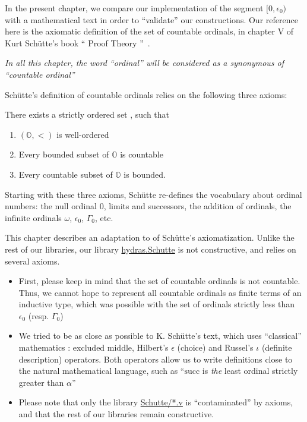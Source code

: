 \label{chap:schutte} 

In the present chapter, we  compare our implementation of the segment $[0,\epsilon_0)$ with a mathematical text in order to ``validate'' our constructions.
Our reference here is the axiomatic definition of the set of countable ordinals,
in chapter V of Kurt Schütte's book `` Proof Theory ''~\cite{schutte}.

\begin{remark}
\emph{In all this chapter, the word ``ordinal'' will be considered as a synonymous of
``countable ordinal''}  
\end{remark}



Schütte's definition of countable ordinals relies on the following three axioms:

There  exists a strictly ordered set , such that
\begin{enumerate}
\item  $(\mathbb{O},<)$ is well-ordered
\item Every bounded subset of $\mathbb{O}$  is countable
\item Every countable subset of $\mathbb{O}$  is bounded.
\end{enumerate}

Starting with these three axioms, Schütte re-defines the vocabulary about ordinal numbers: the null ordinal $0$, limits and successors, the addition of ordinals, the infinite ordinals $\omega$, $\epsilon_0$, $\Gamma_0$, etc.

This chapter describes an adaptation to \coq{} of Schütte's axiomatization. 
 Unlike the rest of our libraries, our library
\href{../theories/html/hydras.Schutte.Schutte.html}{hydras.Schutte}
is not constructive, and relies on several axioms.

\begin{itemize}
\item First, please keep in mind  that the set of countable ordinals is not countable. Thus, we cannot hope to represent all countable ordinals as finite terms of an inductive type, which was possible with  the set of ordinals strictly less than $\epsilon_0$ (resp. $\Gamma_0$)
\item We tried to be as close as possible to K. Schütte's text, which uses ``classical'' mathematics : excluded middle, Hilbert's $\epsilon$ (choice) and Russel's $\iota$ (definite description) operators. Both operators allow us to write definitions close to the natural mathematical language, such as ``$\textrm{succ}$ is \emph{the} least ordinal strictly greater than $\alpha$''
\item Please note that only the library \href{../theories/html/hydras.Schutte.Schutte.html}{Schutte/*.v} is ``contaminated'' by axioms, and that the rest of our libraries remain constructive.
\end{itemize}

